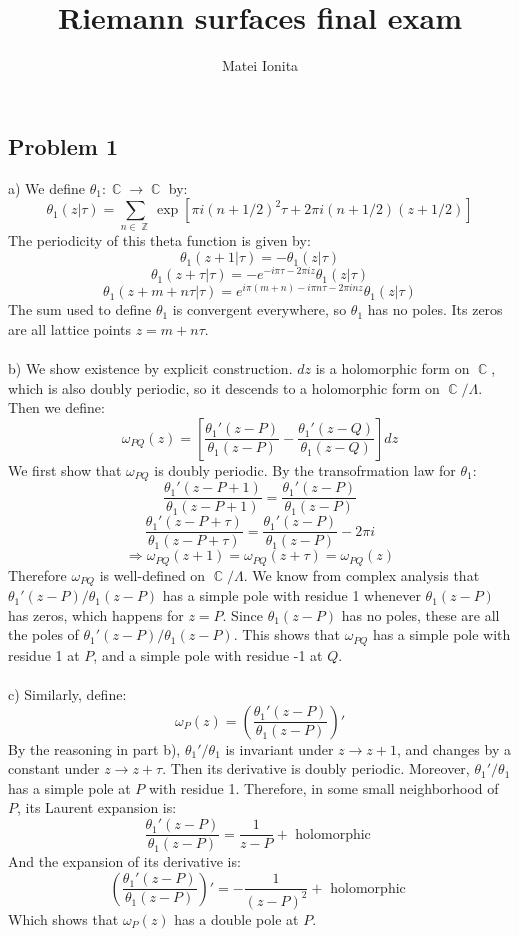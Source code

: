 \documentclass[12 pt]{article}
\title{Riemann surfaces final exam}
\author{Matei Ionita}
\DeclareMathOperator {\C} {\mathbb{C}}
\DeclareMathOperator {\Z} {\mathbb{Z}}
\theoremstyle{plain}
\theoremstyle{definition}
\theoremstyle{remark}
\begin{document}
  \maketitle

\subsection*{Problem 1}
a) We define $\theta_1: \C \to \C$ by:
\[      \theta_1 (z | \tau) = \sum_{n \in \Z} \exp [ \pi i (n+ 1/2)^2 \tau + 2\pi i (n + 1/2) (z + 1/2) ]     \]
The periodicity of this theta function is given by:
\[        \theta_1 (z + 1 | \tau) = -  \theta_1 (z |\tau)      \]
\[          \theta_1 (z + \tau | \tau) = - e^{- i \pi \tau - 2 \pi i z}  \theta_1 (z |\tau)                   \]
\[       \theta_1 (z + m + n\tau | \tau) = e^{i\pi(m+n)-i\pi n \tau - 2 \pi i n z}  \theta_1 (z |\tau)        \]
The sum used to define $\theta_1$ is convergent everywhere, so $\theta_1$ has no poles. Its zeros are all lattice points $z = m + n \tau$.
\\
\\
b) We show existence by explicit construction. $dz$ is a holomorphic form on $\C$, which is also doubly periodic, so it descends to a holomorphic form on $\C/\Lambda$. Then we define:
\[         \omega_{PQ} (z) = \left[ \frac{\theta_1'(z-P)}{\theta_1(z-P)} - \frac{\theta_1'(z-Q)}{\theta_1(z-Q)} \right] dz       \]
We first show that $\omega_{PQ}$ is doubly periodic. By the transofrmation law for $\theta_1$:
\[      \frac{\theta_1'(z-P+1)}{\theta_1(z-P+1)}  =   \frac{\theta_1'(z-P)}{\theta_1(z-P)}       \]
\[       \frac{\theta_1'(z-P+\tau)}{\theta_1(z-P+\tau)}  =   \frac{\theta_1'(z-P)}{\theta_1(z-P)}  - 2 \pi i           \]
\[       \Rightarrow \omega_{PQ} (z+1) = \omega_{PQ} (z+ \tau) = \omega_{PQ} (z)     \]
Therefore $\omega_{PQ}$ is well-defined on $\C/\Lambda$. We know from complex analysis that $\theta_1'(z-P)/\theta_1(z-P)$ has a simple pole with residue 1 whenever $\theta_1(z-P)$ has zeros, which happens for $z = P$. Since $\theta_1(z-P)$ has no poles, these are all the poles of $\theta_1'(z-P)/\theta_1(z-P)$. This shows that $\omega_{PQ}$ has a simple pole with residue 1 at $P$, and a simple pole with residue -1 at $Q$.
\\
\\
c) Similarly, define:
\[       \omega_P (z) = \left( \frac{\theta_1'(z-P)}{\theta_1(z-P)}   \right) '    \]
By the reasoning in part b), $\theta_1'/\theta_1$ is invariant under $z \to z+1$, and changes by a constant under $z \to z+ \tau$. Then its derivative is doubly periodic. Moreover, $\theta_1'/\theta_1$ has a simple pole at $P$ with residue 1. Therefore, in some small neighborhood of $P$, its Laurent expansion is:
\[         \frac{\theta_1'(z-P)}{\theta_1(z-P)} = \frac{1}{z-P} + \text{ holomorphic }      \]
And the expansion of its derivative is:
\[         \left(   \frac{\theta_1'(z-P)}{\theta_1(z-P)} \right) ' = - \frac{1}{(z-P)^2} + \text{ holomorphic }      \]
Which shows that $\omega_P (z)$ has a double pole at $P$.
\end{document}
